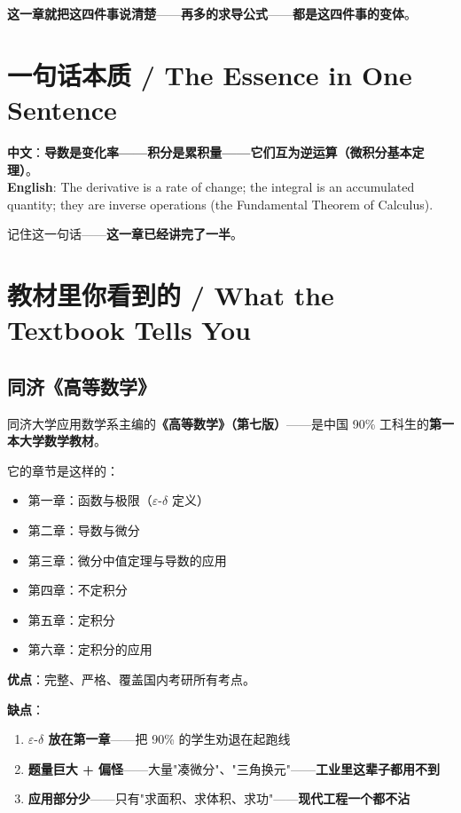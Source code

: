 \textbf{这一章就把这四件事说清楚}——\textbf{再多的求导公式}——\textbf{都是这四件事的变体}。

\section{一句话本质 / The Essence in One Sentence}

\begin{tcolorbox}[essbox={一句话本质}]
\textbf{中文}：\textbf{导数是变化率——积分是累积量——它们互为逆运算（微积分基本定理）}。\\[6pt]
\textbf{English}: The derivative is a rate of change; the integral is an accumulated quantity; they are inverse operations (the Fundamental Theorem of Calculus).
\end{tcolorbox}

记住这一句话——\textbf{这一章已经讲完了一半}。

\section{教材里你看到的 / What the Textbook Tells You}

\subsection{同济《高等数学》}

同济大学应用数学系主编的\textbf{《高等数学》（第七版）}——是中国 90\% 工科生的\textbf{第一本大学数学教材}。

它的章节是这样的：

\begin{itemize}
\item 第一章：函数与极限（$\varepsilon\text{-}\delta$ 定义）
\item 第二章：导数与微分
\item 第三章：微分中值定理与导数的应用
\item 第四章：不定积分
\item 第五章：定积分
\item 第六章：定积分的应用
\end{itemize}

\textbf{优点}：完整、严格、覆盖国内考研所有考点。

\textbf{缺点}：

\begin{enumerate}
\item \textbf{$\varepsilon\text{-}\delta$ 放在第一章}——把 90\% 的学生劝退在起跑线
\item \textbf{题量巨大 + 偏怪}——大量"凑微分"、"三角换元"——\textbf{工业里这辈子都用不到}
\item \textbf{应用部分少}——只有"求面积、求体积、求功"——\textbf{现代工程一个都不沾}
\end{enumerate}

